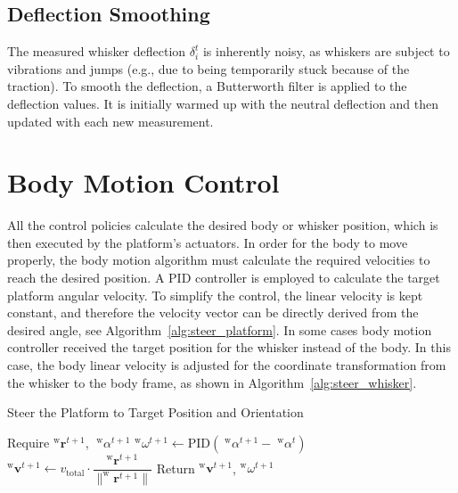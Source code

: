 \subsection{Deflection Smoothing}
The measured whisker deflection \(\delta_{i}^{t}\) is inherently noisy, as whiskers are subject to vibrations and jumps (e.g., due to being temporarily stuck because of the traction).
To smooth the deflection, a Butterworth filter is applied to the deflection values.
It is initially warmed up with the neutral deflection and then updated with each new measurement.


\section{Body Motion Control}
All the control policies calculate the desired body or whisker position, which is then executed by the platform's actuators.
In order for the body to move properly, the body motion algorithm must calculate the required velocities to reach the desired position.
A PID controller is employed to calculate the target platform angular velocity.
To simplify the control, the linear velocity is kept constant, and therefore the velocity vector can be directly derived from the desired angle, see Algorithm~\ref{alg:steer_platform}.
In some cases body motion controller received the target position for the whisker instead of the body.
In this case, the body linear velocity is adjusted for the coordinate transformation from the whisker to the body frame, as shown in Algorithm~\ref{alg:steer_whisker}.

\begin{algorithm}[htb]
    \caption{Steer the Platform to Target Position and Orientation}
    \begin{algorithmic}
        \State Require \(^{\mathrm{w}}\boldsymbol{r}^{t+1}\), \(\;^{\mathrm{w}}\alpha^{t+1}\)
        \State \(^{\mathrm{w}}\omega^{t+1} \gets \mathrm{PID}(\;^{\mathrm{w}}\alpha^{t+1} - \;^{\mathrm{w}}\alpha^{t})\)
        \State \(^{\mathrm{w}}\boldsymbol{v}^{t+1} \gets v_{\mathrm{total}} \cdot \dfrac{^{\mathrm{w}}\boldsymbol{r}^{t+1}}{\|^{\mathrm{w}}\boldsymbol{r}^{t+1}\|}\)
        \State Return \(^{\mathrm{w}}\boldsymbol{v}^{t+1}\), \(^{\mathrm{w}}\omega^{t+1}\)
    \end{algorithmic}
    \label{alg:steer_platform}
\end{algorithm}

